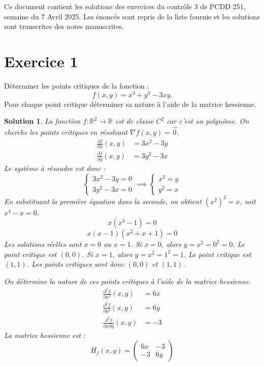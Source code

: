 \documentclass{article}
\newtheorem{solution}{Solution}
\begin{document}
\sloppy

Ce document contient les solutions des exercices du contrôle 3 de PCDD 251, semaine du 7 Avril 2025. Les énoncés sont repris de la liste fournie et les solutions sont transcrites des notes manuscrites.

\section{Exercice 1}
Déterminer les points critiques de la fonction :
\[f(x,y) = x^3 + y^3 - 3xy.\]
Pour chaque point critique déterminer sa nature à l'aide de la matrice hessienne.

\begin{solution}
La fonction $f: \mathbb{R}^2 \to \mathbb{R}$ est de classe $C^2$ car c'est un polynôme.
On cherche les points critiques en résolvant $\nabla f(x,y) = \vec{0}$.
\begin{align*}
\frac{\partial f}{\partial x}(x,y) &= 3x^2 - 3y \\
\frac{\partial f}{\partial y}(x,y) &= 3y^2 - 3x
\end{align*}
Le système à résoudre est donc :
\[ \begin{cases} 3x^2 - 3y = 0 \\ 3y^2 - 3x = 0 \end{cases} \implies \begin{cases} x^2 = y \\ y^2 = x \end{cases} \]
En substituant la première équation dans la seconde, on obtient $(x^2)^2 = x$, soit $x^4 - x = 0$.
\[ x(x^3 - 1) = 0 \]
\[ x(x-1)(x^2+x+1) = 0 \]
Les solutions réelles sont $x=0$ ou $x=1$.
Si $x=0$, alors $y = x^2 = 0^2 = 0$. Le point critique est $(0,0)$.
Si $x=1$, alors $y = x^2 = 1^2 = 1$. Le point critique est $(1,1)$.
Les points critiques sont donc $(0,0)$ et $(1,1)$.

On détermine la nature de ces points critiques à l'aide de la matrice hessienne.
\begin{align*}
\frac{\partial^2 f}{\partial x^2}(x,y) &= 6x \\
\frac{\partial^2 f}{\partial y^2}(x,y) &= 6y \\
\frac{\partial^2 f}{\partial x \partial y}(x,y) &= -3
\end{align*}
La matrice hessienne est :
\[ H_f(x,y) = \begin{pmatrix} 6x & -3 \\ -3 & 6y \end{pmatrix} \]


\end{solution}
\end{document}
